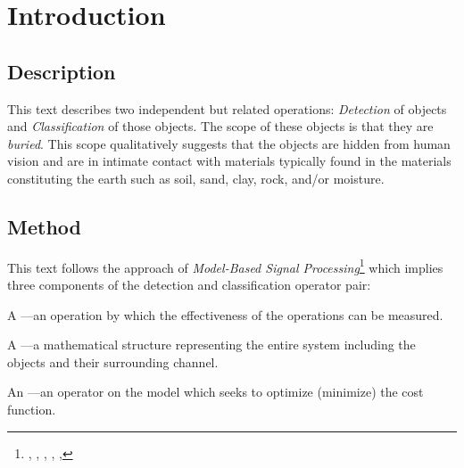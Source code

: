 

\chapter*{Introduction}


\section{Description}
This text describes two independent but related operations: \emph{Detection} of objects 
and \emph{Classification} of those objects.
The scope of these objects is that they are \emph{buried}. 
This scope qualitatively suggests that the objects are hidden from human vision 
and are in intimate contact with materials typically found in the materials constituting the earth such as soil, sand, clay,
rock, and/or moisture.

\section{Method}
This text follows the approach of \emph{Model-Based Signal Processing}\footnote{
  , , , , ,  }
which implies three components of the detection and classification operator pair:
\begin{enume}
  \item A ---an operation by which the effectiveness of the operations can be measured.
  \item A ---a mathematical structure representing the entire system including the objects and their surrounding channel.
  \item An ---an operator on the model which seeks to optimize (minimize) the cost function.
\end{enume}

